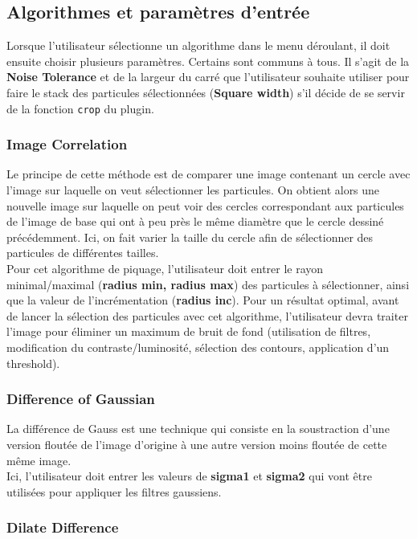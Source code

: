 \subsection{Algorithmes et paramètres d'entrée}

Lorsque l'utilisateur sélectionne un algorithme dans le menu déroulant, il doit ensuite choisir plusieurs paramètres.
Certains sont communs à tous. Il s'agit de la \textbf{Noise Tolerance} et de la largeur du carré que l'utilisateur souhaite utiliser pour faire le stack des particules sélectionnées (\textbf{Square width}) s'il décide de se servir de la fonction \texttt{crop} du plugin.

\subsubsection{Image Correlation}

Le principe de cette méthode est de comparer une image contenant un cercle avec l'image sur laquelle on veut sélectionner les particules. On obtient alors une nouvelle image sur laquelle on peut voir des cercles correspondant aux particules de l'image de base qui ont à peu près le même diamètre que le cercle dessiné précédemment. Ici, on fait varier la taille du cercle afin de sélectionner des particules de différentes tailles.\\
\noindent
Pour cet algorithme de piquage, l'utilisateur doit entrer le rayon minimal/maximal (\textbf{radius min, radius max}) des particules à sélectionner, ainsi que la valeur de l'incrémentation (\textbf{radius inc}). Pour un résultat optimal, avant de lancer la sélection des particules avec cet algorithme, l'utilisateur devra traiter l'image pour éliminer un maximum de bruit de fond (utilisation de filtres, modification du contraste/luminosité, sélection des contours, application d'un threshold).

\subsubsection{Difference of Gaussian}

La différence de Gauss est une technique qui consiste en la soustraction d'une version floutée de l'image d'origine à une autre version moins floutée de cette même image.\\
Ici, l'utilisateur doit entrer les valeurs de \textbf{sigma1} et \textbf{sigma2} qui vont être utilisées pour appliquer les filtres gaussiens.

\subsubsection{Dilate Difference}

